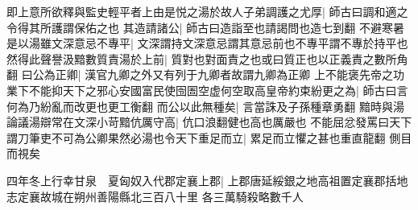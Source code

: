 即上意所欲釋與監史輕平者上由是悦之湯於故人子弟調護之尤厚|{
	師古曰調和適之令得其所護謂保佑之也}
其造請諸公|{
	師古曰造詣至也請謁問也造七到翻}
不避寒暑是以湯雖文深意忌不專平|{
	文深謂持文深意忌謂其意忌前也不專平謂不專於持平也}
然得此聲譽汲黯數質責湯於上前|{
	質對也對面責之也或曰質正也以正義責之數所角翻}
曰公為正卿|{
	漢官九卿之外又有列于九卿者故謂九卿為正卿}
上不能褒先帝之功業下不能抑天下之邪心安國富民使囹圄空虚何空取高皇帝約束紛更之為|{
	師古曰言何為乃紛亂而改更也更工衡翻}
而公以此無種矣|{
	言當誅及子孫種章勇翻}
黯時與湯論議湯辯常在文深小苛黯伉厲守高|{
	伉口浪翻健也高也厲嚴也}
不能屈忿發罵曰天下謂刀筆吏不可為公卿果然必湯也令天下重足而立|{
	累足而立懼之甚也重直龍翻}
側目而視矣

四年冬上行幸甘泉　夏匈奴入代郡定襄上郡|{
	上郡唐延綏銀之地高祖置定襄郡括地志定襄故城在朔州善陽縣北三百八十里}
各三萬騎殺略數千人

